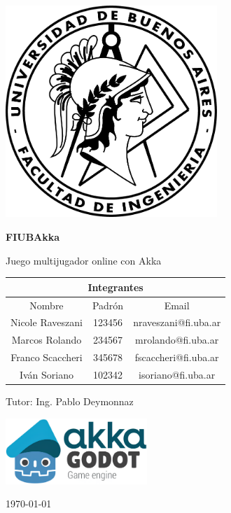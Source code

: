\documentclass[11pt]{article}
\begin{document}

\begin{titlepage}
    \centering
    \includegraphics[width=0.6\textwidth]{../assets/fiuba-logo.png} %
    \vspace{1cm}

    {\Huge \textbf{FIUBAkka}} %
    \vspace{0.5cm}

    {\Large Juego multijugador online con Akka} %
    \vfill

    \begin{table}[h!]
      \centering
      \begin{tabular}{|c|c|c|}
          \hline
          \multicolumn{3}{|c|}{\textbf{Integrantes}} \\
          \hline\hline
          Nombre & Padrón & Email \\
          \hline\hline
          Nicole Raveszani & 123456 & nraveszani@fi.uba.ar \\
          \hline
          Marcos Rolando & 234567 & mrolando@fi.uba.ar \\
          \hline
          Franco Scaccheri & 345678 & fscaccheri@fi.uba.ar \\
          \hline
          Iván Soriano & 102342 & isoriano@fi.uba.ar \\
          \hline
      \end{tabular}
    \end{table}

    \begin{center}
      Tutor: Ing. Pablo Deymonnaz
    \end{center}

    \centering
    \includegraphics[width=0.4\textwidth]{../assets/FIUBAkka-logo.png} %
    \vspace{1cm}

    \today %
\end{titlepage}
\end{document}
